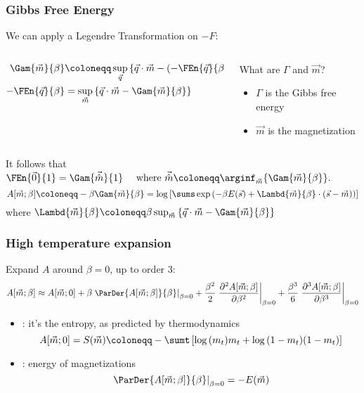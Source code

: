 \begin{frame}
  \frametitle{Gibbs Free Energy}
  We can apply a Legendre Transformation on \(-F\):
  \begin{columns}
    \begin{column}{0.5\textwidth}
      \begin{align*}
        \Gam{\vec{m}}{\beta} &\coloneqq \sup_{\vec{q}}{\left\{\vec{q}\cdot\vec{m}
          - \left(-\FEn{\vec{q}}{\beta}\right)\right\}}\\
        -\FEn{\vec{q}}{\beta}& = \sup_{\vec{m}}{\left\{\vec{q}\cdot\vec{m} - \Gam{\vec{m}}{\beta}\right\}}
      \end{align*}
    \end{column}
    \begin{column}{0.40\textwidth}
      \begin{alertblock}{What are \(\Gamma\) and \(\vec{m}\)?}
        \begin{itemize}
          \item \(\Gamma\) is the Gibbs free energy
          \item \(\vec{m}\) is the magnetization
        \end{itemize}
      \end{alertblock}
    \end{column}
  \end{columns}
	\pause
  \vspace{20pt}
  It follows that
  \(
    \FEn{\vec{0}}{1} = \Gam{\vec{\hat{m}}}{1} \quad 
    \text{ where } \vec{\hat{m}} \coloneqq \arginf_{\vec{m}}{\left\{\Gam{\vec{m}}{\beta}\right\}}.
  \)
  \pause
  \[
    A{\left[\vec{m};\beta\right]} \coloneqq -\beta \Gam{\vec{m}}{\beta} =
    \log{\left[\sums\exp{\left(-\beta E(\vec{s}) +     
        \Lambd{\vec{m}}{\beta}\cdot(\vec{s}-\vec{m})\right)}\right]}
  \]
  \hspace{30pt}where \(\Lambd{\vec{m}}{\beta} \coloneqq \beta \sup_{\vec{m}}{\left\{\vec{q}\cdot\vec{m} - \Gam{\vec{m}}{\beta}\right\}}\)
\end{frame}

\begin{frame}
  \frametitle{High temperature expansion}
  Expand \(A\) around \(\beta = 0\), up to order 3:
  \[ \small
  A{\left[\vec{m};\beta\right]} \approx
  A{\left[\vec{m};0\right]} + 
  \beta \left.\ParDer{A{\left[\vec{m};\beta\right]}}{\beta}\right|_{\beta=0} +
  \frac{\beta^2}{2}
  \left.\frac{\partial^2A{\left[\vec{m};\beta\right]}}{\partial\beta^2}\right|_{\beta=0}+
  \frac{\beta^3}{6} 
  \left.\frac{\partial^3A{\left[\vec{m};\beta\right]}}{\partial\beta^3}\right|_{\beta=0}    
  \]
  \begin{itemize}
    \item<2-> : it's the entropy, as predicted by thermodynamics
    \[
      A{\left[\vec{m};0\right]} = S{\left(\vec{m}\right)} \coloneqq -\sumt\left[\log{\left(m_t\right)}m_t + \log{\left(1-m_t\right)}(1-m_t)\right]
     \]
    \item<3-> : energy of magnetizations
    \[
      \left.\ParDer{A{\left[\vec{m};\beta\right]}}{\beta}\right|_{\beta=0}
      = -E{(\vec{m})}
    \]
  \end{itemize}
\end{frame}

